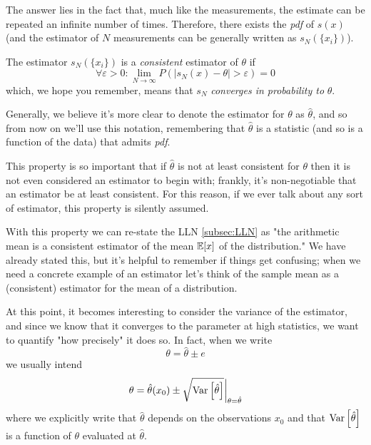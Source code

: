 The answer lies in the fact that, much like the measurements, the estimate can be repeated an infinite number of times. Therefore, there exists the \emph{pdf} of $s(x)$ (and the estimator of $N$ measurements can be generally written as $s_N(\{x_i\})$). 
\begin{definition}
	The estimator $s_N(\{x_i\})$ is a \emph{consistent} estimator of $\theta$ if
	\[
	\forall \varepsilon > 0: \lim_{N\to\infty} P(|s_N(x)-\theta|>\varepsilon)=0
	\]
	which, we hope you remember, means that $s_N$ \emph{converges in probability to} $\theta$.
\label{def:consistent_estimator}
\end{definition}

Generally, we believe it's more clear to denote the estimator for $\theta$ as $\hat{\theta}$, and so from now on we'll use this notation, remembering that $\hat{\theta}$ is a statistic (and so is a function of the data) that admits \emph{pdf}.

This property is so important that if $\hat{\theta}$ is not at least consistent for $\theta$ then  it is not even considered an estimator to begin with; frankly, it's non-negotiable that an estimator be at least consistent. For this reason, if we ever talk about any sort of estimator, this property is silently assumed. 

With this property we can re-state the LLN \ref{subsec:LLN} as "the arithmetic mean is a consistent estimator of the mean $\mathbb{E}[x]$ of the distribution." We have already stated this, but it's helpful to remember if things get confusing; when we need a concrete example of an estimator let's think of the sample mean as a (consistent) estimator for the mean of a distribution.

At this point, it becomes interesting to consider the variance of the estimator, and since we know that it converges to the parameter at high statistics, we want to quantify "how precisely" it does so. In fact, when we write 
	\[
	\theta = \hat{\theta} \pm e
	\]
we usually intend 
	\[
	\theta = \hat{\theta}(x_0) \pm \sqrt{\operatorname{Var}\left[\hat\theta\right]}\bigg\rvert_{\theta=\hat{\theta}}	
	\]
where we explicitly write that $\hat{\theta}$ depends on the observations $x_0$ and that $\operatorname{Var}\left[\hat\theta\right]$ is a function of $\theta$ evaluated at $\hat{\theta}$.


